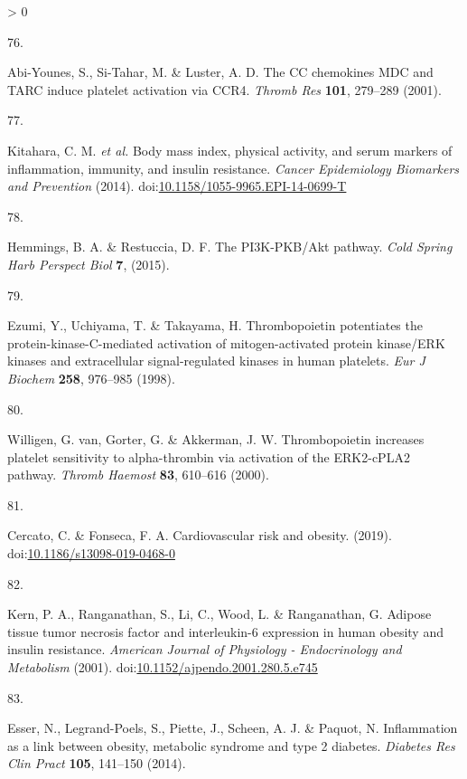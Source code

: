 \documentclass[11pt,twoside]{bristolthesis}
\newlength{\cslhangindent}
\newlength{\csllabelwidth}
\newenvironment{CSLReferences}[2] %
 {%
  \setlength{\parindent}{0pt}
  \ifodd #1 \everypar{\setlength{\hangindent}{\cslhangindent}}\ignorespaces\fi
  \ifnum #2 > 0
  \setlength{\parskip}{#2\baselineskip}
  \fi
 }%
 {}
\newcommand{\CSLLeftMargin}[1]{\parbox[t]{\csllabelwidth}{#1}}
\newcommand{\CSLRightInline}[1]{\parbox[t]{\linewidth - \csllabelwidth}{#1}\break}
\begin{document}
\begin{CSLReferences}{0}{0}
\leavevmode\hypertarget{ref-Abi-Younes2001}{}%
\CSLLeftMargin{76. }
\CSLRightInline{Abi-Younes, S., Si-Tahar, M. \& Luster, A. D. {The CC chemokines MDC and TARC induce platelet activation via CCR4}. \emph{Thromb Res} \textbf{101}, 279--289 (2001).}

\leavevmode\hypertarget{ref-Kitahara2014}{}%
\CSLLeftMargin{77. }
\CSLRightInline{Kitahara, C. M. \emph{et al.} {Body mass index, physical activity, and serum markers of inflammation, immunity, and insulin resistance}. \emph{Cancer Epidemiology Biomarkers and Prevention} (2014). doi:\href{https://doi.org/10.1158/1055-9965.EPI-14-0699-T}{10.1158/1055-9965.EPI-14-0699-T}}

\leavevmode\hypertarget{ref-Hemmings2015}{}%
\CSLLeftMargin{78. }
\CSLRightInline{Hemmings, B. A. \& Restuccia, D. F. {The PI3K-PKB/Akt pathway}. \emph{Cold Spring Harb Perspect Biol} \textbf{7}, (2015).}

\leavevmode\hypertarget{ref-Ezumi1998}{}%
\CSLLeftMargin{79. }
\CSLRightInline{Ezumi, Y., Uchiyama, T. \& Takayama, H. {Thrombopoietin potentiates the protein-kinase-C-mediated activation of mitogen-activated protein kinase/ERK kinases and extracellular signal-regulated kinases in human platelets}. \emph{Eur J Biochem} \textbf{258}, 976--985 (1998).}

\leavevmode\hypertarget{ref-VanWilligen2000}{}%
\CSLLeftMargin{80. }
\CSLRightInline{Willigen, G. van, Gorter, G. \& Akkerman, J. W. {Thrombopoietin increases platelet sensitivity to alpha-thrombin via activation of the ERK2-cPLA2 pathway}. \emph{Thromb Haemost} \textbf{83}, 610--616 (2000).}

\leavevmode\hypertarget{ref-Cercato2019}{}%
\CSLLeftMargin{81. }
\CSLRightInline{Cercato, C. \& Fonseca, F. A. {Cardiovascular risk and obesity}. (2019). doi:\href{https://doi.org/10.1186/s13098-019-0468-0}{10.1186/s13098-019-0468-0}}

\leavevmode\hypertarget{ref-Kern2001}{}%
\CSLLeftMargin{82. }
\CSLRightInline{Kern, P. A., Ranganathan, S., Li, C., Wood, L. \& Ranganathan, G. {Adipose tissue tumor necrosis factor and interleukin-6 expression in human obesity and insulin resistance}. \emph{American Journal of Physiology - Endocrinology and Metabolism} (2001). doi:\href{https://doi.org/10.1152/ajpendo.2001.280.5.e745}{10.1152/ajpendo.2001.280.5.e745}}

\leavevmode\hypertarget{ref-Esser2014}{}%
\CSLLeftMargin{83. }
\CSLRightInline{Esser, N., Legrand-Poels, S., Piette, J., Scheen, A. J. \& Paquot, N. {Inflammation as a link between obesity, metabolic syndrome and type 2 diabetes}. \emph{Diabetes Res Clin Pract} \textbf{105}, 141--150 (2014).}


\end{CSLReferences}
\end{document}
